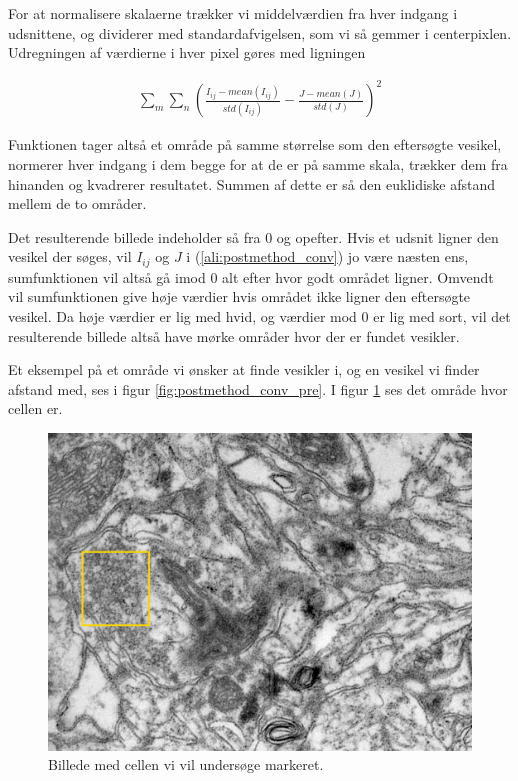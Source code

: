 For at normalisere skalaerne trækker vi middelværdien fra hver indgang i udsnittene, og dividerer med standardafvigelsen, som vi så gemmer i centerpixlen. Udregningen af værdierne i hver pixel gøres med ligningen

\begin{align}
	\sum_m\sum_n \left(\frac{I_{ij}-mean(I_{ij})}{std(I_{ij})}-\frac{J-mean(J)}{std(J)}\right)^2 \label{ali:postmethod_conv}
\end{align}

Funktionen tager altså et område på samme størrelse som den eftersøgte vesikel, normerer hver indgang i dem begge for at de er på samme skala, trækker dem fra hinanden og kvadrerer resultatet. Summen af dette er så den euklidiske afstand mellem de to områder.

Det resulterende billede indeholder så fra 0 og opefter. Hvis et udsnit ligner den vesikel der søges, vil $I_{ij}$ og $J$ i (\ref{ali:postmethod_conv}) jo være næsten ens, sumfunktionen vil altså gå imod 0 alt efter hvor godt området ligner. Omvendt vil sumfunktionen give høje værdier hvis området ikke ligner den eftersøgte vesikel. Da høje værdier er lig med hvid, og værdier mod 0 er lig med sort, vil det resulterende billede altså have mørke områder hvor der er fundet vesikler. 

Et eksempel på et område vi ønsker at finde vesikler i, og en vesikel vi finder afstand med, ses i figur \ref{fig:postmethod_conv_pre}. I figur \ref{fig:postmethod_conv_area1} ses det område hvor cellen er.

\begin{figure}[H]
		\centering
		\includegraphics[scale=0.5]{files/postmethod/img/area_1.png}
	\caption{Billede med cellen vi vil undersøge markeret.\label{fig:postmethod_conv_area1}}
\end{figure}

